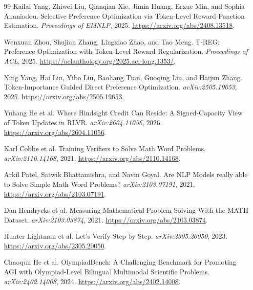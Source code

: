 \documentclass[11pt]{article}
\begin{document}
\begin{thebibliography}{99}
Kailai Yang, Zhiwei Liu, Qianqian Xie, Jimin Huang, Erxue Min, and Sophia
Ananiadou.
\newblock Selective Preference Optimization via Token-Level Reward Function
Estimation.
\newblock \emph{Proceedings of EMNLP}, 2025.
\newblock \url{https://arxiv.org/abs/2408.13518}.

Wenxuan Zhou, Shujian Zhang, Lingxiao Zhao, and Tao Meng.
\newblock T-REG: Preference Optimization with Token-Level Reward
Regularization.
\newblock \emph{Proceedings of ACL}, 2025.
\newblock \url{https://aclanthology.org/2025.acl-long.1353/}.

Ning Yang, Hai Lin, Yibo Liu, Baoliang Tian, Guoqing Liu, and Haijun Zhang.
\newblock Token-Importance Guided Direct Preference Optimization.
\newblock \emph{arXiv:2505.19653}, 2025.
\newblock \url{https://arxiv.org/abs/2505.19653}.

Yuhang He et al.
\newblock Where Hindsight Credit Can Reside: A Signed-Capacity View of Token
Updates in RLVR.
\newblock \emph{arXiv:2604.11056}, 2026.
\newblock \url{https://arxiv.org/abs/2604.11056}.

Karl Cobbe et al.
\newblock Training Verifiers to Solve Math Word Problems.
\newblock \emph{arXiv:2110.14168}, 2021.
\newblock \url{https://arxiv.org/abs/2110.14168}.

Arkil Patel, Satwik Bhattamishra, and Navin Goyal.
\newblock Are NLP Models really able to Solve Simple Math Word Problems?
\newblock \emph{arXiv:2103.07191}, 2021.
\newblock \url{https://arxiv.org/abs/2103.07191}.

Dan Hendrycks et al.
\newblock Measuring Mathematical Problem Solving With the MATH Dataset.
\newblock \emph{arXiv:2103.03874}, 2021.
\newblock \url{https://arxiv.org/abs/2103.03874}.

Hunter Lightman et al.
\newblock Let's Verify Step by Step.
\newblock \emph{arXiv:2305.20050}, 2023.
\newblock \url{https://arxiv.org/abs/2305.20050}.

Chaoqun He et al.
\newblock OlympiadBench: A Challenging Benchmark for Promoting AGI with
Olympiad-Level Bilingual Multimodal Scientific Problems.
\newblock \emph{arXiv:2402.14008}, 2024.
\newblock \url{https://arxiv.org/abs/2402.14008}.

\end{thebibliography}
\end{document}
